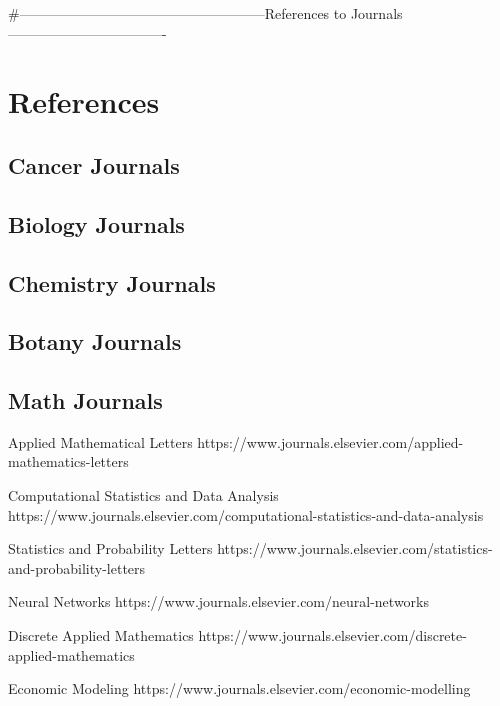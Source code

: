 #-----------------------------------------------------References to Journals----------------------------------
\section{References}



\subsection{Cancer Journals}


\subsection{Biology Journals}


\subsection{Chemistry Journals}


\subsection{Botany Journals}


\subsection{Math Journals}

 Applied Mathematical Letters
\newblock https://www.journals.elsevier.com/applied-mathematics-letters

Computational Statistics and Data Analysis
\newblock https://www.journals.elsevier.com/computational-statistics-and-data-analysis

Statistics and Probability Letters
\newblock https://www.journals.elsevier.com/statistics-and-probability-letters

Neural Networks
\newblock https://www.journals.elsevier.com/neural-networks

Discrete Applied Mathematics
\newblock https://www.journals.elsevier.com/discrete-applied-mathematics

Economic Modeling
\newblock https://www.journals.elsevier.com/economic-modelling



